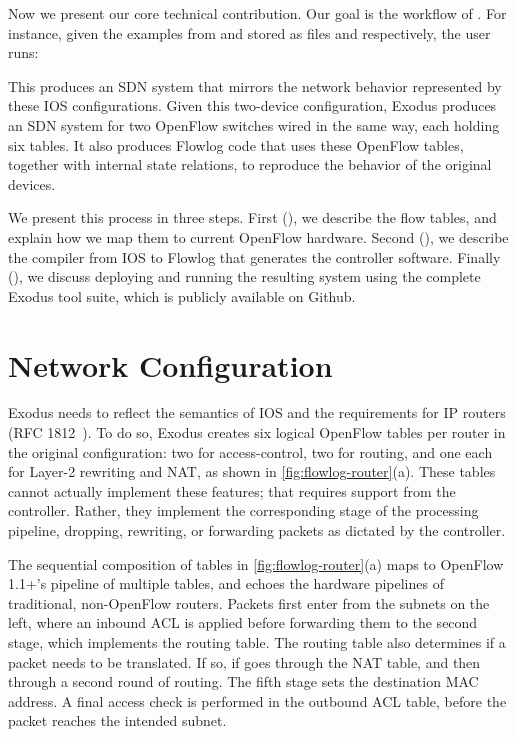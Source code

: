 Now we present our core technical contribution. Our goal is the
workflow of . For instance, given the examples from 
 and 
stored as files  and  respectively, the
user runs:

{\centering {}}

\noindent
This produces an SDN system that mirrors the network behavior
represented by these IOS configurations. Given this two-device
configuration, Exodus produces an SDN system for two OpenFlow switches
wired in the same way, each holding six tables. It also
produces Flowlog code that uses these OpenFlow tables, together with
internal state relations, to reproduce the behavior of the original
devices.

We present this process in three steps. First (), we
describe the flow tables, and explain how we map them to
current OpenFlow hardware. Second (), we describe
the compiler from IOS to Flowlog that generates the controller
software. Finally (), we discuss
deploying and running the resulting system using the
complete Exodus tool suite, which is publicly available on Github.

\section{Network Configuration}
\label{sec:net-conf}

Exodus needs to reflect the semantics of IOS and the requirements for
IP routers (RFC 1812~\cite{rfc1812}). To do so, Exodus creates six logical
OpenFlow tables per router in the original configuration: two for access-control, two for routing, and one each
for Layer-2 rewriting and NAT, as shown in \autoref{fig:flowlog-router}(a).
These tables cannot actually implement these features;
that requires support from the controller. Rather, they implement the
corresponding stage of the processing pipeline,
dropping, rewriting, or forwarding packets as dictated by the controller.

The sequential composition of tables in \autoref{fig:flowlog-router}(a)
maps to OpenFlow 1.1+'s pipeline of multiple tables, and echoes the
hardware pipelines of traditional, non-OpenFlow routers.  Packets
first enter from the subnets on the left, where an inbound ACL is
applied before forwarding them to the second stage, which implements
the routing table.  The routing table also determines if a packet
needs to be translated. If so, if goes through the NAT table, and then
through a second round of routing. The fifth stage sets the
destination MAC address. A final access check is performed in the
outbound ACL table, before the packet reaches the intended subnet.


